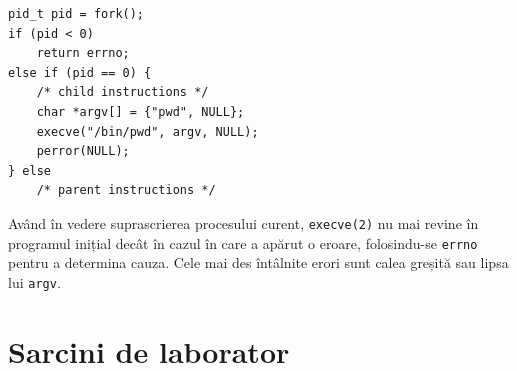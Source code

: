 \documentclass[12pt,a4paper]{article}
\begin{document}
\newpage

\begin{lstlisting}
pid_t pid = fork();
if (pid < 0)
    return errno;
else if (pid == 0) {
    /* child instructions */
    char *argv[] = {"pwd", NULL};
    execve("/bin/pwd", argv, NULL);
    perror(NULL);
} else
    /* parent instructions */
\end{lstlisting}

Având în vedere suprascrierea procesului curent, 
\texttt{execve(2)} nu mai revine în programul inițial 
decât în cazul în care a apărut o eroare, 
folosindu-se \texttt{errno} pentru a determina cauza. 
Cele mai des întâlnite erori sunt calea greșită sau lipsa lui
\texttt{argv}.

\section{Sarcini de laborator}
\end{document}
